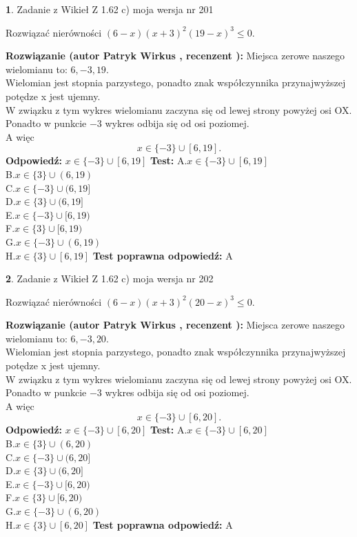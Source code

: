 \documentclass[12pt, a4paper]{article}
\theoremstyle{definition} %
\newtheorem{zad}{}
\newcommand{\zadStart}[1]{\begin{zad}#1\newline}
\newcommand{\zadStop}{\end{zad}}
\newcommand{\rozwStart}[2]{\noindent \textbf{Rozwiązanie (autor #1 , recenzent #2): }\newline}
\newcommand{\rozwStop}{\newline}
\newcommand{\odpStart}{\noindent \textbf{Odpowiedź:}\newline}
\newcommand{\odpStop}{\newline}
\newcommand{\testStart}{\noindent \textbf{Test:}\newline}
\newcommand{\testStop}{\newline}
\newcommand{\kluczStart}{\noindent \textbf{Test poprawna odpowiedź:}\newline}
\newcommand{\kluczStop}{\newline}
\begin{document}
\zadStart{Zadanie z Wikieł Z 1.62 c) moja wersja nr 201}

Rozwiązać nierówności $(6-x)(x+3)^{2}(19-x)^{3}\le0$.
\zadStop
\rozwStart{Patryk Wirkus}{}
Miejsca zerowe naszego wielomianu to: $6, -3, 19$.\\
Wielomian jest stopnia parzystego, ponadto znak współczynnika przy\linebreak najwyższej potędze x jest ujemny.\\ W związku z tym wykres wielomianu zaczyna się od lewej strony powyżej osi OX.\\
Ponadto w punkcie $-3$ wykres odbija się od osi poziomej.\\
A więc $$x \in \{-3\} \cup [6,19].$$
\rozwStop
\odpStart
$x \in \{-3\} \cup [6,19]$
\odpStop
\testStart
A.$x \in \{-3\} \cup [6,19]$\\
B.$x \in \{3\} \cup (6,19)$\\
C.$x \in \{-3\} \cup (6,19]$\\
D.$x \in \{3\} \cup (6,19]$\\
E.$x \in \{-3\} \cup [6,19)$\\
F.$x \in \{3\} \cup [6,19)$\\
G.$x \in \{-3\} \cup (6,19)$\\
H.$x \in \{3\} \cup [6,19]$
\testStop
\kluczStart
A
\kluczStop



\zadStart{Zadanie z Wikieł Z 1.62 c) moja wersja nr 202}

Rozwiązać nierówności $(6-x)(x+3)^{2}(20-x)^{3}\le0$.
\zadStop
\rozwStart{Patryk Wirkus}{}
Miejsca zerowe naszego wielomianu to: $6, -3, 20$.\\
Wielomian jest stopnia parzystego, ponadto znak współczynnika przy\linebreak najwyższej potędze x jest ujemny.\\ W związku z tym wykres wielomianu zaczyna się od lewej strony powyżej osi OX.\\
Ponadto w punkcie $-3$ wykres odbija się od osi poziomej.\\
A więc $$x \in \{-3\} \cup [6,20].$$
\rozwStop
\odpStart
$x \in \{-3\} \cup [6,20]$
\odpStop
\testStart
A.$x \in \{-3\} \cup [6,20]$\\
B.$x \in \{3\} \cup (6,20)$\\
C.$x \in \{-3\} \cup (6,20]$\\
D.$x \in \{3\} \cup (6,20]$\\
E.$x \in \{-3\} \cup [6,20)$\\
F.$x \in \{3\} \cup [6,20)$\\
G.$x \in \{-3\} \cup (6,20)$\\
H.$x \in \{3\} \cup [6,20]$
\testStop
\kluczStart
A
\kluczStop
\end{document}
